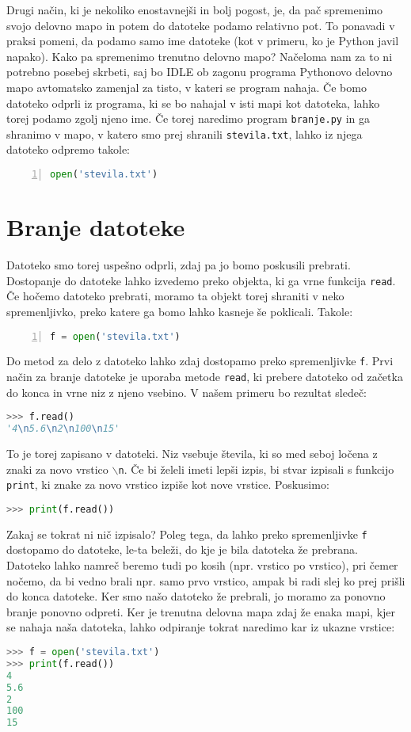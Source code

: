 Drugi način, ki je nekoliko enostavnejši in bolj pogost, je, da pač spremenimo svojo delovno mapo in potem do datoteke podamo relativno pot. To ponavadi v praksi pomeni, da podamo samo ime datoteke (kot v primeru, ko je Python javil napako). Kako pa spremenimo trenutno delovno mapo? Načeloma nam za to ni potrebno posebej skrbeti, saj bo IDLE ob zagonu programa Pythonovo delovno mapo avtomatsko zamenjal za tisto, v kateri se program nahaja. Če bomo datoteko odprli iz programa, ki se bo nahajal v isti mapi kot datoteka, lahko torej podamo zgolj njeno ime. Če torej naredimo program \texttt{branje.py} in ga shranimo v mapo, v katero smo prej shranili \texttt{stevila.txt}, lahko iz njega datoteko odpremo takole:
\begin{lstlisting}[language=Python, showstringspaces=false, numbers=left]
open('stevila.txt')
\end{lstlisting}

\section{Branje datoteke}
Datoteko smo torej uspešno odprli, zdaj pa jo bomo poskusili prebrati. Dostopanje do datoteke lahko izvedemo preko objekta, ki ga vrne funkcija \texttt{read}. Če hočemo datoteko prebrati, moramo ta objekt torej shraniti v neko spremenljivko, preko katere ga bomo lahko kasneje še poklicali. Takole:
\begin{lstlisting}[language=Python, showstringspaces=false, numbers=left]
f = open('stevila.txt')
\end{lstlisting}
Do metod za delo z datoteko lahko zdaj dostopamo preko spremenljivke \texttt{f}. Prvi način za branje datoteke je uporaba metode \texttt{read}, ki prebere datoteko od začetka do konca in vrne niz z njeno vsebino. V našem primeru bo rezultat sledeč:
\begin{lstlisting}[language=Python, showstringspaces=false]
>>> f.read()
'4\n5.6\n2\n100\n15'
\end{lstlisting}
To je torej zapisano v datoteki. Niz vsebuje števila, ki so med seboj ločena z znaki za novo vrstico \texttt{$\backslash$n}. Če bi želeli imeti lepši izpis, bi stvar izpisali s funkcijo \texttt{print}, ki znake za novo vrstico izpiše kot nove vrstice. Poskusimo:
\begin{lstlisting}[language=Python, showstringspaces=false]
>>> print(f.read())

\end{lstlisting}
Zakaj se tokrat ni nič izpisalo? Poleg tega, da lahko preko spremenljivke \texttt{f} dostopamo do datoteke, le-ta beleži, do kje je bila datoteka že prebrana. Datoteko lahko namreč beremo tudi po kosih (npr. vrstico po vrstico), pri čemer nočemo, da bi vedno brali npr. samo prvo vrstico, ampak bi radi slej ko prej prišli do konca datoteke. Ker smo našo datoteko že prebrali, jo moramo za ponovno branje ponovno odpreti. Ker je trenutna delovna mapa zdaj že enaka mapi, kjer se nahaja naša datoteka, lahko odpiranje tokrat naredimo kar iz ukazne vrstice:
\begin{lstlisting}[language=Python, showstringspaces=false]
>>> f = open('stevila.txt')
>>> print(f.read())
4
5.6
2
100
15
\end{lstlisting}

